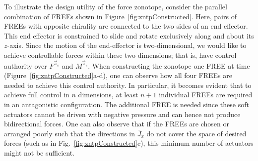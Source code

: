 To illustrate the design utility of the force zonotope, consider the parallel combination of FREEs shown in Figure~\ref{fig:zntpConstructed}.
Here, pairs of FREEs with opposite chirality are connected to the two sides of an end effector.
This end effector is constrained to slide and rotate exclusively along and about its $z$-axis.
Since the motion of the end-effector is two-dimensional, we would like to achieve controllable forces within these two dimensions; that is, have control authority over $F^{\vec{z}_e}$ and $M^{\vec{z}_e}$.
When constructing the zonotope one FREE at time (Figure~\ref{fig:zntpConstructed}a-d), one can observe how all four FREEs are needed to achieve this control authority.
In particular, it becomes evident that to achieve full control in $n$ dimensions, at least $n+1$ individual FREEs are required in an antagonistic configuration.
The additional FREE is needed since these soft actuators cannot be driven with negative pressure and can hence not produce bidirectional forces.
One can also observe that if the FREEs are chosen or arranged poorly such that the directions in $\bar{J}_{x}$ do not cover the space of desired forces (such as in Fig.~\ref{fig:zntpConstructed}c), this minimum number of actuators might not be sufficient.
























